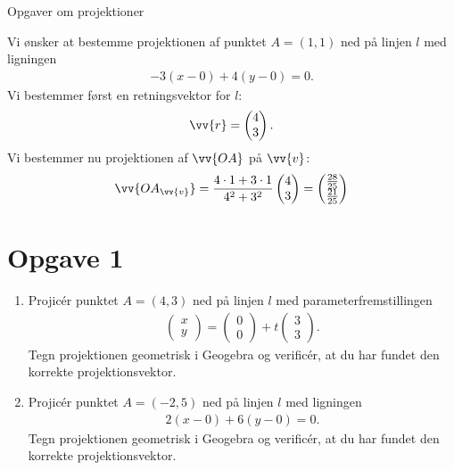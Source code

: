 
\begin{center}
\Huge
Opgaver om projektioner
\end{center}
\begin{exa}
Vi ønsker at bestemme projektionen af punktet $A = (1,1)$ ned på linjen $l$ med ligningen 
\begin{align*}
-3(x-0) + 4(y-0) = 0.
\end{align*}
Vi bestemmer først en retningsvektor for $l$:
\begin{align*}
\vv{r} = 
\begin{pmatrix}
4 \\ 3
\end{pmatrix}.
\end{align*}
Vi bestemmer nu projektionen af $\vv{OA}$ på $\vv{v}$:
\begin{align*}
\vv{OA_{\vv{v}}} = \frac{4\cdot 1 + 3 \cdot 1}{4^2+3^2}\begin{pmatrix}
4 \\ 3
\end{pmatrix} = \begin{pmatrix}
\frac{28}{25} \\ \frac{21}{25}
\end{pmatrix}
\end{align*}
\end{exa}


\section*{Opgave 1}

\begin{enumerate}[label=\roman*)]
\item Projicér punktet $A=(4,3)$ ned på linjen $l$ med parameterfremstillingen
\begin{align*}
\begin{pmatrix}
x \\ y
\end{pmatrix}
 = 
\begin{pmatrix}
0 \\ 0
\end{pmatrix}
+ t
\begin{pmatrix}
3 \\ 3
\end{pmatrix}.
\end{align*}
Tegn projektionen geometrisk i Geogebra og verificér, at du har fundet den korrekte projektionsvektor.

\item Projicér punktet $A = (-2,5)$ ned på linjen $l$ med ligningen
\begin{align*}
2(x-0) + 6(y-0)=0.
\end{align*}
Tegn projektionen geometrisk i Geogebra og verificér, at du har fundet den korrekte projektionsvektor. 
\end{enumerate}

